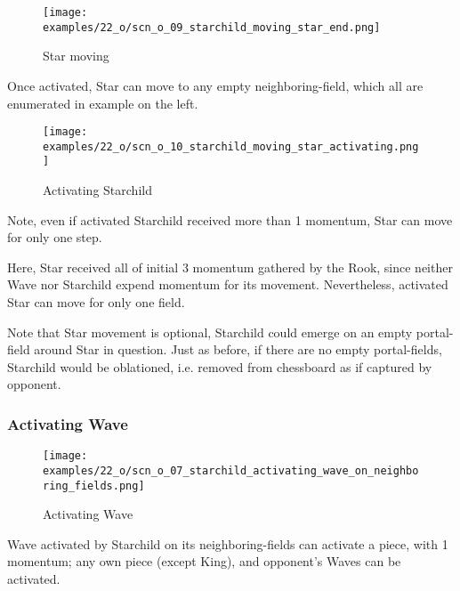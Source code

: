 \vspace*{2.1\baselineskip}
\noindent
\begin{wrapfigure}[4]{l}{0.4\textwidth}
\centering
\texttt{[image: examples/22\_o/scn\_o\_09\_starchild\_moving\_star\_end.png]}
\caption{Star moving}
\label{fig:scn_o_09_starchild_moving_star_end}
\end{wrapfigure}
Once activated, Star can move to any empty neighboring-field, which all are enumerated
in example on the left.

\vspace*{2.3\baselineskip}
\noindent
\begin{wrapfigure}[9]{l}{0.4\textwidth}
\centering
\texttt{[image: examples/22\_o/scn\_o\_10\_starchild\_moving\_star\_activating.png]}
\caption{Activating Starchild}
\label{fig:scn_o_10_starchild_moving_star_activating}
\end{wrapfigure}
Note, even if activated Starchild received more than 1 momentum, Star can move for
only one step.

Here, Star received all of initial 3 momentum gathered by the Rook, since neither
Wave nor Starchild expend momentum for its movement. Nevertheless, activated Star
can move for only one field.

Note that Star movement is optional, Starchild could emerge on an empty portal-field
around Star in question. Just as before, if there are no empty portal-fields, Starchild
would be oblationed, i.e. removed from chessboard as if captured by opponent.

\clearpage %

\subsubsection*{Activating Wave}

\noindent
\begin{wrapfigure}[8]{l}{0.4\textwidth}
\centering
\texttt{[image: examples/22\_o/scn\_o\_07\_starchild\_activating\_wave\_on\_neighboring\_fields.png]}
\caption{Activating Wave}
\label{fig:scn_o_07_starchild_activating_wave_on_neighboring_fields}
\end{wrapfigure}
Wave activated by Starchild on its neighboring-fields can activate a piece, with 1 momentum;
any own piece (except King), and opponent's Waves can be activated.

